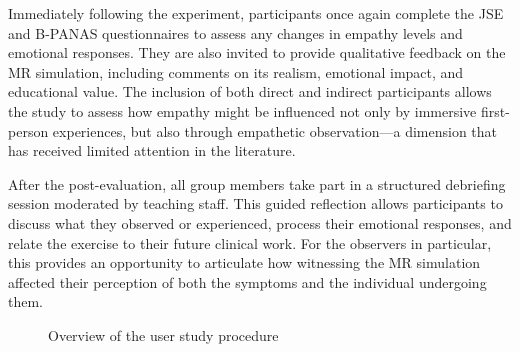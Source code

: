 \vspace{1em}

Immediately following the experiment, participants once again complete the JSE and B-PANAS questionnaires to assess any changes in empathy levels and emotional responses. They are also invited to provide qualitative feedback on the MR simulation, including comments on its realism, emotional impact, and educational value. The inclusion of both direct and indirect participants allows the study to assess how empathy might be influenced not only by immersive first-person experiences, but also through empathetic observation—a dimension that has received limited attention in the literature.

\vspace{1em}

After the post-evaluation, all group members take part in a structured debriefing session moderated by teaching staff. This guided reflection allows participants to discuss what they observed or experienced, process their emotional responses, and relate the exercise to their future clinical work. For the observers in particular, this provides an opportunity to articulate how witnessing the MR simulation affected their perception of both the symptoms and the individual undergoing them.

\begin{figure}[H]
\centering
{}
\caption{Overview of the user study procedure}
\label{fig:userstudy_flowchart}
\end{figure}

